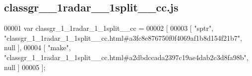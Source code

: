 \subsection{classgr\+\_\+\_\+1radar\+\_\+\_\+1split\+\_\+\+\_\+cc.\+js}
\label{classgr__1__1radar__1__1split____cc_8js_source}

\begin{DoxyCode}
00001 var classgr_1_1radar_1_1split__cc =
00002 [
00003     [ \textcolor{stringliteral}{"sptr"}, \textcolor{stringliteral}{"classgr\_1\_1radar\_1\_1split\_\_cc.html#a3fc8e876750f0f4069af1b8d154f21b7"}, null ],
00004     [ \textcolor{stringliteral}{"make"}, \textcolor{stringliteral}{"classgr\_1\_1radar\_1\_1split\_\_cc.html#a2dbdccada2397c19ae4dab2c3d8fa98b"}, null ]
00005 ];
\end{DoxyCode}
